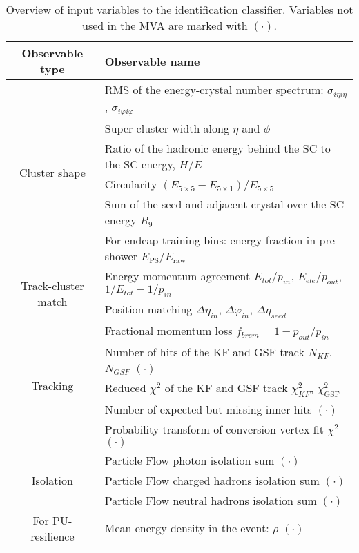 \begin{table}[ht]
  \caption{Overview of input variables to the identification classifier. Variables not used in the \RunII{} MVA are marked with  $(\mathord{\cdot})$.}
  \label{tab:ele_ID_input_variables}
  \small
  \centering
  \begin{tabular}{c l}
    \toprule
    Observable type & Observable name \\
    \midrule
    \multirow{6}{*}{Cluster shape}
      & RMS of the energy-crystal number spectrum: $\sigma_{i\eta i\eta}$, $\sigma_{i\varphi i\varphi}$ \\
      & Super cluster width along $\eta$ and $\phi$ \\
      & Ratio of the hadronic energy behind the SC to the SC energy, $H/E$ \\
      & Circularity $(E_{5\times5} - E_{5\times1})/E_{5\times5}$ \\
      & Sum of the seed and adjacent crystal over the SC energy $R_{9}$ \\
      & For endcap training bins: energy fraction in pre-shower $E_\text{PS}/E_\text{raw}$ \\
    \hline
    \multirow{2}{*}{Track-cluster match}
      & Energy-momentum agreement $E_{tot}/p_{in}$, $E_{ele}/p_{out}$, $1/E_{tot} - 1/p_{in}$ \\
      & Position matching $\Delta\eta_{in}$, $\Delta\varphi_{in}$, $\Delta\eta_{seed}$ \\
    \hline
    \multirow{5}{*}{Tracking}
      & Fractional momentum loss $f_{brem} = 1 - p_{out}/p_{in}$ \\
      & Number of hits of the KF and GSF track $N_{KF}$, $N_{GSF}$ $(\mathord{\cdot})$ \\
      & Reduced $\chi^2$ of the KF and GSF track $\chi^{2}_{KF}$, $\chi^{2}_{\textrm{GSF}}$ \\
      & Number of expected but missing inner hits $(\mathord{\cdot})$ \\
      & Probability transform of conversion vertex fit $\chi^2$ $(\mathord{\cdot})$ \\
    \hline
    \multirow{3}{*}{Isolation}
      & Particle Flow photon isolation sum $(\mathord{\cdot})$ \\
      & Particle Flow charged hadrons isolation sum $(\mathord{\cdot})$ \\
      & Particle Flow neutral hadrons isolation sum $(\mathord{\cdot})$ \\
    \hline
    \multirow{1}{*}{For PU-resilience}
      & Mean energy density in the event: $\rho$ $(\mathord{\cdot})$ \\
    \bottomrule
  \end{tabular}
\end{table}


